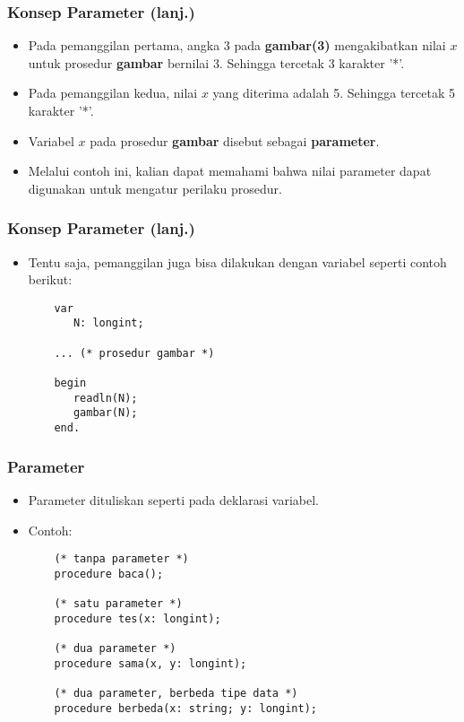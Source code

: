 \documentclass{beamer}
\begin{document}
\begin{frame}[fragile]
\frametitle{Konsep Parameter (lanj.)}
\begin{itemize}
	\item Pada pemanggilan pertama, angka 3 pada \textbf{gambar(3)} mengakibatkan nilai $x$ untuk prosedur \textbf{gambar} bernilai 3. Sehingga tercetak 3 karakter '*'.
	\item Pada pemanggilan kedua, nilai $x$ yang diterima adalah 5. Sehingga tercetak 5 karakter '*'.
	\item Variabel $x$ pada prosedur \textbf{gambar} disebut sebagai \alert{\textbf{parameter}}.
	\item Melalui contoh ini, kalian dapat memahami bahwa nilai parameter dapat digunakan untuk mengatur perilaku prosedur.
\end{itemize}
\end{frame}

\begin{frame}[fragile]
\frametitle{Konsep Parameter (lanj.)}
\begin{itemize}
	\item Tentu saja, pemanggilan juga bisa dilakukan dengan variabel seperti contoh berikut:
	\begin{lstlisting}
	var
	   N: longint;
	   
	... (* prosedur gambar *)   
	   
	begin
	   readln(N);
	   gambar(N);
	end.
	\end{lstlisting}
\end{itemize}
\end{frame}

\begin{frame}[fragile]
\frametitle{Parameter}
\begin{itemize}
	\item Parameter dituliskan seperti pada deklarasi variabel.
	\item Contoh:
	\begin{lstlisting}
	(* tanpa parameter *)
	procedure baca();
	
	(* satu parameter *)
	procedure tes(x: longint);
	
	(* dua parameter *)
	procedure sama(x, y: longint); 
	
	(* dua parameter, berbeda tipe data *)
	procedure berbeda(x: string; y: longint); 
	\end{lstlisting}
\end{itemize}
\end{frame}
\end{document}
